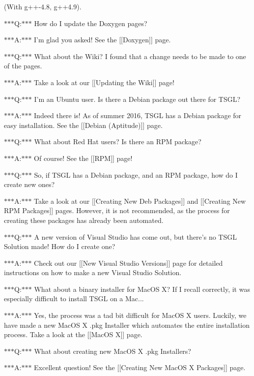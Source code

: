 (With g++-\/4.8, g++4.9).

$\ast$$\ast$$\ast$\-Q\-:$\ast$$\ast$$\ast$ How do I update the Doxygen pages?

$\ast$$\ast$$\ast$\-A\-:$\ast$$\ast$$\ast$ I'm glad you asked! See the \mbox{[}\mbox{[}Doxygen\mbox{]}\mbox{]} page.

$\ast$$\ast$$\ast$\-Q\-:$\ast$$\ast$$\ast$ What about the Wiki? I found that a change needs to be made to one of the pages.

$\ast$$\ast$$\ast$\-A\-:$\ast$$\ast$$\ast$ Take a look at our \mbox{[}\mbox{[}Updating the Wiki\mbox{]}\mbox{]} page!

$\ast$$\ast$$\ast$\-Q\-:$\ast$$\ast$$\ast$ I'm an Ubuntu user. Is there a Debian package out there for T\-S\-G\-L?

$\ast$$\ast$$\ast$\-A\-:$\ast$$\ast$$\ast$ Indeed there is! As of summer 2016, T\-S\-G\-L has a Debian package for easy installation. See the \mbox{[}\mbox{[}Debian (Aptitude)\mbox{]}\mbox{]} page.

$\ast$$\ast$$\ast$\-Q\-:$\ast$$\ast$$\ast$ What about Red Hat users? Is there an R\-P\-M package?

$\ast$$\ast$$\ast$\-A\-:$\ast$$\ast$$\ast$ Of course! See the \mbox{[}\mbox{[}R\-P\-M\mbox{]}\mbox{]} page!

$\ast$$\ast$$\ast$\-Q\-:$\ast$$\ast$$\ast$ So, if T\-S\-G\-L has a Debian package, and an R\-P\-M package, how do I create new ones?

$\ast$$\ast$$\ast$\-A\-:$\ast$$\ast$$\ast$ Take a look at our \mbox{[}\mbox{[}Creating New Deb Packages\mbox{]}\mbox{]} and \mbox{[}\mbox{[}Creating New R\-P\-M Packages\mbox{]}\mbox{]} pages. However, it is not recommended, as the process for creating these packages has already been automated.

$\ast$$\ast$$\ast$\-Q\-:$\ast$$\ast$$\ast$ A new version of Visual Studio has come out, but there's no T\-S\-G\-L Solution made! How do I create one?

$\ast$$\ast$$\ast$\-A\-:$\ast$$\ast$$\ast$ Check out our \mbox{[}\mbox{[}New Visual Studio Versions\mbox{]}\mbox{]} page for detailed instructions on how to make a new Visual Studio Solution.

$\ast$$\ast$$\ast$\-Q\-:$\ast$$\ast$$\ast$ What about a binary installer for Mac\-O\-S X? If I recall correctly, it was especially difficult to install T\-S\-G\-L on a Mac...

$\ast$$\ast$$\ast$\-A\-:$\ast$$\ast$$\ast$ Yes, the process was a tad bit difficult for Mac\-O\-S X users. Luckily, we have made a new Mac\-O\-S X .pkg Installer which automates the entire installation process. Take a look at the \mbox{[}\mbox{[}Mac\-O\-S X\mbox{]}\mbox{]} page.

$\ast$$\ast$$\ast$\-Q\-:$\ast$$\ast$$\ast$ What about creating new Mac\-O\-S X .pkg Installers?

$\ast$$\ast$$\ast$\-A\-:$\ast$$\ast$$\ast$ Excellent question! See the \mbox{[}\mbox{[}Creating New Mac\-O\-S X Packages\mbox{]}\mbox{]} page. 